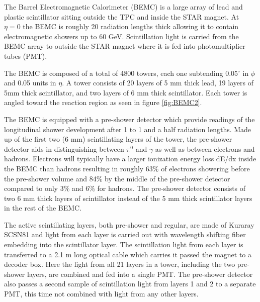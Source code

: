 \documentclass[abstract = on,listof=totoc, bibliography=totoc]{scrreprt}
\begin{document}
The Barrel Electromagnetic Calorimeter (BEMC) is a large array of lead and plastic scintillator sitting outside the TPC and inside the STAR magnet. At $\eta = 0$ the BEMC is roughly 20 radiation lengths thick allowing it to contain electromagnetic showers up to 60 GeV. Scintillation light is carried from the BEMC array to outside the STAR magnet where it is fed into photomultiplier tubes (PMT).

The BEMC is composed of a total of 4800 towers, each one subtending 0.05$^\circ$ in $\phi$ and 0.05 units in $\eta$. A tower consists of 20 layers of 5 mm thick lead, 19 layers of 5mm thick scintillator, and two layers of 6 mm thick scintillator. Each tower is angled toward the reaction region as seen in figure \ref{fig:BEMC2}.  

The BEMC is equipped with a pre-shower detector which provide readings of the longitudinal shower development after 1 to 1 and a half radiation lengths. Made up of the first two (6 mm) scintillating layers of the tower, the pre-shower detector aids in distinguishing between $\pi^0$ and $\gamma$ as well as between electrons and hadrons. Electrons will typically have a larger ionization energy loss dE/dx inside the BEMC than hadrons resulting in roughly 63\% of electrons showering before the pre-shower volume and 84\% by the middle of the pre-shower detector compared to only 3\% and 6\% for hadrons. The pre-shower detector consists of two 6 mm thick layers of scintillator instead of the 5 mm thick scintillator layers in the rest of the BEMC. 

The active scintillating layers, both pre-shower and regular, are made of Kuraray SCSN81 and light from each layer is carried out with wavelength shifting fiber embedding into the scintillator layer. The scintillation light from each layer is transferred to a 2.1 m long optical cable which carries it passed the magnet to a decoder box. Here the light from all 21 layers in a tower, including the two pre-shower layers, are combined and fed into a single PMT. The pre-shower detector also passes a second sample of scintillation light from layers 1 and 2 to a separate PMT, this time not combined with light from any other layers.  
\end{document}
